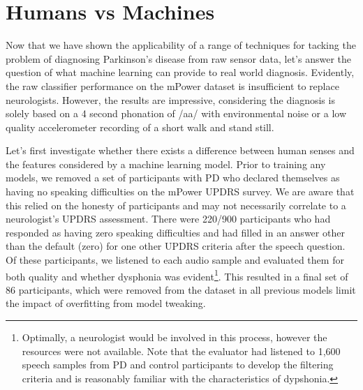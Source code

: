 \documentclass[12pt, twoside]{book}
\begin{document}






\section{Humans vs Machines}
\label{powerml}
Now that we have shown the applicability of a range of techniques for tacking the problem of diagnosing Parkinson's disease from raw sensor data, let's answer the question of what machine learning can provide to real world diagnosis. Evidently, the raw classifier performance on the mPower dataset is insufficient to replace neurologists. However, the results are impressive, considering the diagnosis is solely based on a 4 second phonation of /aa/ with environmental noise or a low quality accelerometer recording of a short walk and stand still.

Let's first investigate whether there exists a difference between human senses and the features considered by a machine learning model. Prior to training any models, we removed a set of participants with PD who declared themselves as having no speaking difficulties on the mPower UPDRS survey. We are aware that this relied on the honesty of participants and may not necessarily correlate to a neurologist's UPDRS assessment. There were 220/900 participants who had responded as having zero speaking difficulties and had filled in an answer other than the default (zero) for one other UPDRS criteria after the speech question. Of these participants, we listened to each audio sample and evaluated them for both quality and whether dysphonia was evident\footnote{Optimally, a neurologist would be involved in this process, however the resources were not available. Note that the evaluator had listened to 1,600 speech samples from PD and control participants to develop the filtering criteria and is reasonably familiar with the characteristics of dypshonia.}. This resulted in a final set of 86 participants, which were removed from the dataset in all previous models limit the impact of overfitting from model tweaking. 
\end{document}
